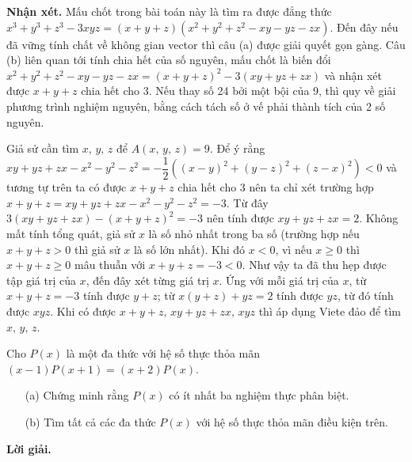 \textbf{Nhận xét. }Mấu chốt trong bài toán này là tìm ra được đẳng thức $x^3 + y^3 + z^3 - 3xyz = (x+y+z)(x^2+y^2+z^2-xy-yz-zx)$. Đến đây nếu đã vững tính chất về không gian vector thì câu (a) được giải quyết gọn gàng. Câu (b) liên quan tới tính chia hết của số nguyên, mấu chốt là biến đổi $x^2+y^2+z^2-xy-yz-zx = (x+y+z)^2 - 3(xy+yz+zx)$ và nhận xét được $x+y+z$ chia hết cho 3. Nếu thay số 24 bởi một bội của 9, thì quy về giải phương trình nghiệm nguyên, bằng cách tách số ở vế phải thành tích của 2 số nguyên. 

Giả sử cần tìm $x,\,y,\,z$ để $A(x,\,y,\,z) = 9$. Để ý rằng $xy+yz+zx-x^2-y^2-z^2 = -\dfrac{1}{2}\left((x-y)^2 + (y-z)^2 + (z-x)^2\right) < 0$ và tương tự trên ta có được $x+y+z$ chia hết cho 3 nên ta chỉ xét trường hợp $x+y+z = xy+yz+zx-x^2-y^2-z^2 = -3$. Từ đây $3(xy+yz+zx)-(x+y+z)^2 = -3$ nên tính được $xy+yz+zx = 2$. Không mất tính tổng quát, giả sử $x$ là số nhỏ nhất trong ba số (trường hợp nếu $x+y+z > 0$ thì giả sử $x$ là số lớn nhất). Khi đó $x < 0$, vì nếu $x \geq 0$ thì $x + y + z \geq 0$ mâu thuẫn với $x + y + z = -3 < 0$. Như vậy ta đã thu hẹp được tập giá trị của $x$, đến đây xét từng giá trị $x$. Ứng với mỗi giá trị của $x$, từ $x + y + z = -3$ tính được $y + z$; từ $x(y+z) + yz=2$ tính được $yz$, từ đó tính được $xyz$. Khi có được $x+y+z,\,xy+yz+zx,\,xyz$ thì áp dụng Viete đảo để tìm $x,\,y,\,z$.

\begin{tcolorbox}[title=\textbf{Bài toán A.3.},breakable]
    Cho $P(x)$ là một đa thức với hệ số thực thỏa mãn $(x-1)P(x+1) = (x+2)P(x)$.
    \begin{enumerate}
        \item[(a)] {Chứng minh rằng $P(x)$ có ít nhất ba nghiệm thực phân biệt.}
        \item[(b)] {Tìm tất cả các đa thức $P(x)$ với hệ số thực thỏa mãn điều kiện trên.}
    \end{enumerate}
\end{tcolorbox}

\textbf{Lời giải. }

